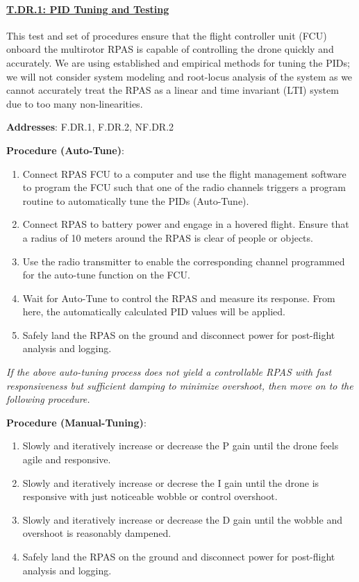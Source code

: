 \paragraph{\underline{T.DR.1: PID Tuning and Testing}}

This test and set of procedures ensure that the flight controller unit (FCU) onboard the multirotor RPAS is capable of controlling the drone quickly and accurately. We are using established and empirical methods for tuning the PIDs; we will not consider system modeling and root-locus analysis of the system as we cannot accurately treat the RPAS as a linear and time invariant (LTI) system due to too many non-linearities.

\textbf{Addresses}: F.DR.1, F.DR.2, NF.DR.2

\textbf{Procedure (Auto-Tune)}:
\begin{enumerate}[noitemsep]
    \item Connect RPAS FCU to a computer and use the flight management software to program the FCU such that one of the radio channels triggers a program routine to automatically tune the PIDs (Auto-Tune).
    \item Connect RPAS to battery power and engage in a hovered flight. Ensure that a radius of 10 meters around the RPAS is clear of people or objects.
    \item Use the radio transmitter to enable the corresponding channel programmed for the auto-tune function on the FCU.
    \item Wait for Auto-Tune to control the RPAS and measure its response. From here, the automatically calculated PID values will be applied.
    \item Safely land the RPAS on the ground and disconnect power for post-flight analysis and logging.
\end{enumerate}

\textit{If the above auto-tuning process does not yield a controllable RPAS with fast responsiveness but sufficient damping to minimize overshoot, then move on to the following procedure.}

\textbf{Procedure (Manual-Tuning)}:
\begin{enumerate}[noitemsep]
    \item Slowly and iteratively increase or decrease the P gain until the drone feels agile and responsive.
    \item Slowly and iteratively increase or decrese the I gain until the drone is responsive with just noticeable wobble or control overshoot.
    \item Slowly and iteratively increase or decrease the D gain until the wobble and overshoot is reasonably dampened.
    \item Safely land the RPAS on the ground and disconnect power for post-flight analysis and logging.
\end{enumerate}


